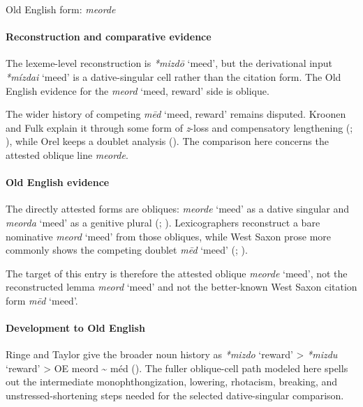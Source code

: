 \documentclass[
  british,
  a4paper,
]{article}
\providecommand{\Recon}[1]{\emph{*#1}}
\begin{document}
Old English form: \emph{meorde}

\paragraph{Reconstruction and comparative
evidence}\label{reconstruction-and-comparative-evidence-139}

The lexeme-level reconstruction is \Recon{mizdō} `meed', but the
derivational input \Recon{mízdai} `meed' is a dative-singular cell
rather than the citation form. The Old English evidence for the
{\emph{meord}} `meed, reward' side is oblique.

The wider history of competing {\emph{mēd}} `meed, reward' remains
disputed. Kroonen and Fulk explain it through some form of \emph{z}-loss
and compensatory lengthening (; ), while Orel keeps a
doublet analysis (). The
comparison here concerns the attested oblique line \emph{meorde}.

\paragraph{Old English evidence}\label{old-english-evidence-141}

The directly attested forms are obliques: {\emph{meorde}} `meed' as a
dative singular and {\emph{meorda}} `meed' as a genitive plural
(;
).
Lexicographers reconstruct a bare nominative {\emph{meord}} `meed' from
those obliques, while West Saxon prose more commonly shows the competing
doublet \emph{mēd} `meed' (; ).

The target of this entry is therefore the attested oblique
{\emph{meorde}} `meed', not the reconstructed lemma {\emph{meord}}
`meed' and not the better-known West Saxon citation form \emph{mēd}
`meed'.

\paragraph{Development to Old
English}\label{development-to-old-english-139}

Ringe and Taylor give the broader noun history as \Recon{mizdo} `reward'
\textgreater{} \Recon{mizdu} `reward' \textgreater{} OE meord
\textasciitilde{} méd (). The fuller oblique-cell path modeled here spells out the
intermediate monophthongization, lowering, rhotacism, breaking, and
unstressed-shortening steps needed for the selected dative-singular
comparison.
\end{document}
